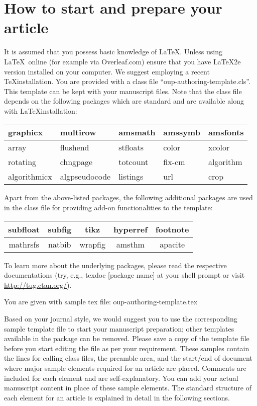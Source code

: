 \documentclass{article}
\begin{document}
\vfill\eject

\section{How to start and prepare your article}
It is assumed that you possess basic knowledge of \LaTeX. Unless
using \LaTeX\ online (for example via Overleaf.com) ensure that you
have \LaTeX2e version installed on your computer. We suggest
employing a recent \TeX installation. You are provided with a class
file ``oup-authoring-template.cls''. This template can be kept with
your manuscript files. Note that the class file depends on the
following packages which are standard and are available along with
\LaTeX installation:

\begin{center}\begin{tabular}{|l|l|l|l|l|}\hline
graphicx & multirow & amsmath & amssymb & amsfonts \\\hline
array & flushend & stfloats & color & xcolor \\\hline
rotating & chngpage & totcount & fix-cm & algorithm \\\hline
algorithmicx & algpseudocode & listings & url & crop \\\hline
\end{tabular}\end{center}

Apart from the above-listed packages, the following additional packages are used in the class file for providing add-on functionalities to the template:

\begin{center}\begin{tabular}{|c|c|c|c|c|}\hline
subfloat & subfig & tikz & hyperref & footnote \\\hline
mathrsfs & natbib & wrapfig & amsthm & apacite \\\hline
\end{tabular}\end{center}

To learn more about the underlying packages, please read the respective documentations (try, e.g., texdoc [package name] at your shell prompt or visit \url{http://tug.ctan.org/}).

\medskip

\noindent You are given with sample tex file: oup-authoring-template.tex

\medskip

Based on your journal style, we would suggest you to use the corresponding sample template file to start your manuscript preparation; other templates available in the package can be removed. Please save a copy of the template file before you start editing the file as per your requirement. These samples contain the lines for calling class files, the preamble area, and the start/end of document where major sample elements required for an article are placed. Comments are included for each element and are self-explanatory. You can add your actual manuscript content in place of these sample elements. The standard structure of each element for an article is explained in detail in the following sections.
\end{document}
